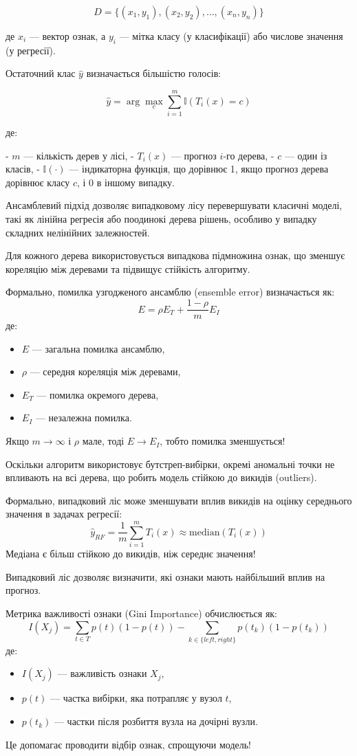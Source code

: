 \documentclass[14pt,a4paper,titlepage,oneside]{book}
\numberwithin{equation}{part}
\begin{document}
\[
D = \{(x_1, y_1), (x_2, y_2), \dots, (x_n, y_n)\}
\]

де \( x_i \) — вектор ознак, а \( y_i \) — мітка класу (у класифікації) або числове значення (у регресії).



Остаточний клас \( \hat{y} \) визначається більшістю голосів:

\[
\hat{y} = \arg\max_c \sum_{i=1}^{m} \mathbb{I}(T_i(x) = c)
\]


де:

- \( m \) — кількість дерев у лісі,
- \( T_i(x) \) — прогноз \( i \)-го дерева,
- \( c \) — один із класів,
- \( \mathbb{I}(\cdot) \) — індикаторна функція, що дорівнює 1, якщо прогноз дерева дорівнює класу \( c \), і 0 в іншому випадку.





Ансамблевий підхід дозволяє випадковому лісу перевершувати класичні моделі, такі як лінійна регресія або поодинокі дерева рішень, особливо у випадку складних нелінійних залежностей.

Для кожного дерева використовується випадкова підмножина ознак, що зменшує кореляцію між деревами та підвищує стійкість алгоритму.

Формально, помилка узгодженого ансамблю (ensemble error) визначається як:
\[
E = \rho E_T + \frac{1 - \rho}{m} E_I
\]
де:
\begin{itemize}
    \item $E$ — загальна помилка ансамблю,
    \item $\rho$ — середня кореляція між деревами,
    \item $E_T$ — помилка окремого дерева,
    \item $E_I$ — незалежна помилка.
\end{itemize}
Якщо $m \to \infty$ і $\rho$ мале, тоді $E \to E_I$, тобто помилка зменшується!


Оскільки алгоритм використовує бутстреп-вибірки, окремі аномальні точки не впливають на всі дерева, що робить модель стійкою до викидів (outliers).

Формально, випадковий ліс може зменшувати вплив викидів на оцінку середнього значення в задачах регресії:
\[
\hat{y}_{RF} = \frac{1}{m} \sum_{i=1}^{m} T_i(x) \approx \text{median}(T_i(x))
\]
Медіана є більш стійкою до викидів, ніж середнє значення!


Випадковий ліс дозволяє визначити, які ознаки мають найбільший вплив на прогноз.

Метрика важливості ознаки (Gini Importance) обчислюється як:
\[
I(X_j) = \sum_{t \in T} p(t)(1 - p(t)) - \sum_{k \in \{left, right\}} p(t_k)(1 - p(t_k))
\]
де:
\begin{itemize}
    \item $I(X_j)$ — важливість ознаки $X_j$,
    \item $p(t)$ — частка вибірки, яка потрапляє у вузол $t$,
    \item $p(t_k)$ — частки після розбиття вузла на дочірні вузли.
\end{itemize}
Це допомагає проводити відбір ознак, спрощуючи модель!
\end{document}
